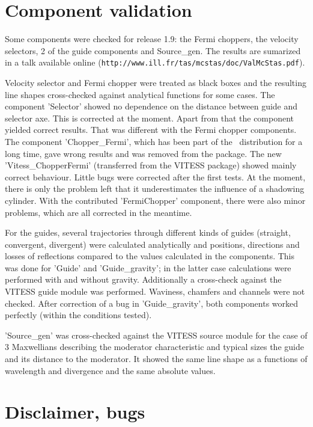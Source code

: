 \section{Component validation}

Some components were checked for release 1.9: the Fermi choppers, the velocity selectors, 2 of the guide components and Source\_gen. The results are sumarized in a talk available online (\verb+http://www.ill.fr/tas/mcstas/doc/ValMcStas.pdf+).

Velocity selector and Fermi chopper were treated as black boxes and the resulting line shapes cross-checked against analytical functions for some cases.
The component 'Selector' showed no dependence on the distance between guide and selector axe. This is corrected at the moment. Apart from that the component yielded correct results.
That was different with the Fermi chopper components. The component 'Chopper\_Fermi', which has been part of the \MCS\ distribution for a long time, gave wrong results and was removed from the package. The new 'Vitess\_ChopperFermi' (transferred from the VITESS package) showed mainly correct behaviour. Little bugs were corrected after the first tests. At the moment, there is only the problem left that it underestimates the influence of a shadowing cylinder. With the contributed 'FermiChopper' component, there were also minor problems, which are all corrected in the meantime.

For the guides, several trajectories through different kinds of guides (straight, convergent, divergent) were calculated analytically and positions, directions and losses of reflections compared to the values calculated in the components. This was done for 'Guide' and 'Guide\_gravity'; in the latter case calculations were performed with and without gravity. Additionally a cross-check against the VITESS guide module was performed. Waviness, chamfers and channels were not checked.
After correction of a bug in 'Guide\_gravity', both components worked perfectly (within the conditions tested).

'Source\_gen' was cross-checked against the VITESS source module for the case of 3 Maxwellians describing the moderator characteristic and typical sizes the guide and its distance to the moderator. It showed the same line shape as a functions of wavelength and divergence and the same absolute values.

\section{Disclaimer, bugs}


